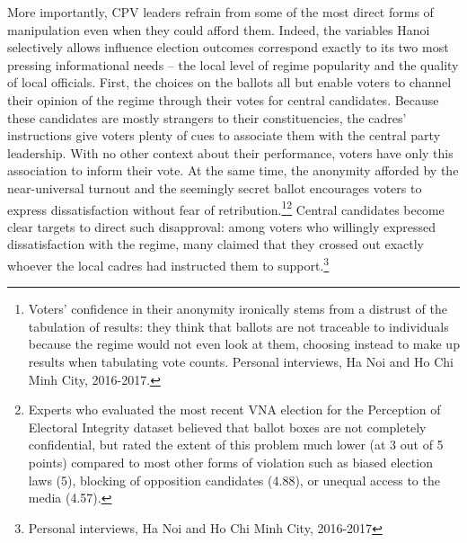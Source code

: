 \documentclass[12pt]{article}
\newcommand\fnote[1]{\footnote{\baselineskip=2\normalbaselineskip#1}}
\newcommand{\1}{\mathbbm{1}}
\begin{document}
More importantly, CPV leaders refrain from some of the most direct forms of manipulation even when they could afford them. Indeed, the variables Hanoi selectively allows influence election outcomes correspond exactly to its two most pressing informational needs -- the local level of regime popularity and the quality of local officials. First, the choices on the ballots all but enable voters to channel their opinion of the regime through their votes for central candidates. Because these candidates are mostly strangers to their constituencies, the cadres' instructions give voters plenty of cues to associate them with the central party leadership. With no other context about their performance, voters have only this association to inform their vote. At the same time, the anonymity afforded by the near-universal turnout and the seemingly secret ballot encourages voters to express dissatisfaction without fear of retribution.\fnote{Voters' confidence in their anonymity ironically stems from a distrust of the tabulation of results: they think that ballots are not traceable to individuals because the regime would not even look at them, choosing instead to make up results when tabulating vote counts. Personal interviews, Ha Noi and Ho Chi Minh City, 2016-2017.}\fnote{Experts who evaluated the most recent VNA election for the Perception of Electoral Integrity dataset \citep{PEI} believed that ballot boxes are not completely confidential, but rated the extent of this problem much lower (at 3 out of 5 points) compared to most other forms of violation such as biased election laws (5), blocking of opposition candidates (4.88), or unequal access to the media (4.57).} Central candidates become clear targets to direct such disapproval: among voters who willingly expressed dissatisfaction with the regime, many claimed that they crossed out exactly whoever the local cadres had instructed them to support.\fnote{Personal interviews, Ha Noi and Ho Chi Minh City, 2016-2017}
\end{document}
